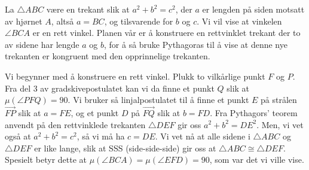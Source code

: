 \begin{oppgave}[5.4.3]
    La $\triangle ABC$ være en trekant slik at $a^2+b^2=c^2$, der $a$ er lengden på siden motsatt av hjørnet $A$, altså $a=BC$, og tilsvarende for $b$ og $c$. 
    Vi vil vise at vinkelen $\angle BCA$ er en rett vinkel. 
    Planen vår er å konstruere en rettvinklet trekant der to av sidene har lengde $a$ og $b$, for å så bruke Pythagoras til å vise at denne nye trekanten er kongruent med den opprinnelige trekanten. 

    Vi begynner med å konstruere en rett vinkel. 
    Plukk to vilkårlige punkt $F$ og $P$. 
    Fra del 3 av gradskivepostulatet kan vi da finne et punkt $Q$ slik at $\mu(\angle PFQ)=90$. 
    Vi bruker så linjalpostulatet til å finne et punkt $E$ på strålen $\overrightarrow{FP}$ slik at $a=FE$, og et punkt $D$ på $\overrightarrow{FQ}$ slik at $b=FD$. 
    Fra Pythagors' teorem anvendt på den rettvinklede trekanten $\triangle DEF$ gir oss $a^2+b^2=DE^2$. 
    Men, vi vet også at $a^2+b^2=c^2$, så vi må ha $c=DE$. 
    Vi vet nå at alle sidene i $\triangle ABC$ og $\triangle DEF$ er like lange, slik at SSS (side-side-side) gir oss at $\triangle ABC\cong \triangle DEF$. 
    Spesielt betyr dette at $\mu(\angle BCA)=\mu(\angle EFD)=90$, som var det vi ville vise. 

    \begin{figure}[H]
        \centering
         
    \end{figure}
\end{oppgave}